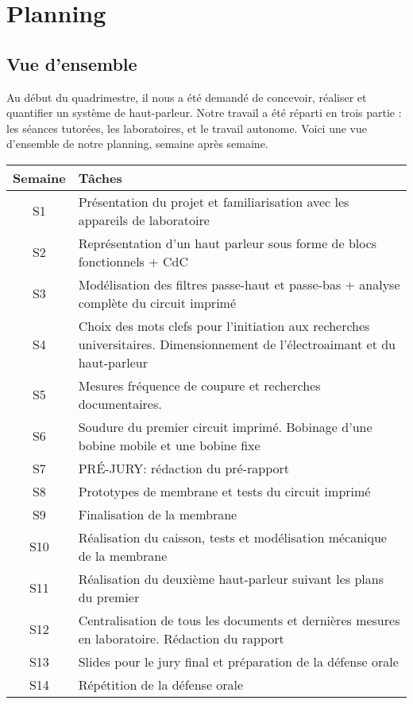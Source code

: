 

\section{Planning}

\subsection{Vue d'ensemble}
Au début du quadrimestre, il nous a été demandé de concevoir, réaliser et quantifier un système de haut-parleur.
Notre travail a été réparti en trois partie : les séances tutorées, les laboratoires, et le travail autonome. 
Voici une vue d'ensemble de notre planning, semaine après semaine. \\


\begin{tabular}{|c||p{9cm}|}
	\hline 
	Semaine & Tâches \\
	\hline
	\hline
  S1 & Présentation du projet et familiarisation avec les appareils de laboratoire\\
  S2 & Représentation d'un haut parleur sous forme de blocs fonctionnels +  CdC\\
	S3 & Modélisation des filtres passe-haut et passe-bas + analyse complète du circuit imprimé\\
	S4 & Choix des mots clefs pour l'initiation aux recherches universitaires. Dimensionnement de l'électroaimant et du haut-parleur\\
	S5 & Mesures fréquence de coupure et recherches documentaires. \\
	S6 & Soudure du premier circuit imprimé. Bobinage d'une bobine mobile et une bobine fixe\\
	S7 & PRÉ-JURY: rédaction du pré-rapport\\
	S8 & Prototypes de membrane et tests du circuit imprimé\\
	S9 & Finalisation de la membrane\\
	S10 & Réalisation du caisson, tests et modélisation mécanique de la membrane\\
	S11 & Réalisation du deuxième haut-parleur suivant les plans du premier\\
	S12 & Centralisation de tous les documents et dernières mesures en laboratoire. Rédaction du rapport\\
	S13 & Slides pour le jury final et préparation de la défense orale\\
	S14 & Répétition de la défense orale\\
	\hline
\end{tabular}


